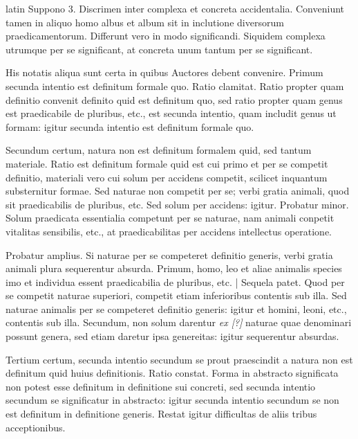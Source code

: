 \begin{otherlanguage*}{latin}
\pstart
Suppono 3. Discrimen inter complexa et  concreta accidentalia. Conveniunt tamen in aliquo homo albus et album sit in inclutione diversorum praedicamentorum. Differunt vero in modo significandi. Siquidem complexa utrumque per se significant, at concreta unum tantum per se significant. 
\pend

\pstart
His notatis aliqua sunt certa in quibus Auctores debent convenire. Primum secunda intentio est definitum formale quo. Ratio clamitat. Ratio propter quam definitio convenit definito quid est definitum quo, sed ratio propter quam genus est praedicabile de pluribus, etc., est secunda intentio, quam includit genus ut formam:
igitur secunda intentio est definitum formale quo. 
\pend

\pstart
Secundum certum, natura non est definitum formalem quid, sed tantum materiale. Ratio est definitum formale quid est cui primo et per se competit definitio, materiali vero cui solum per accidens competit, scilicet inquantum substernitur formae. Sed naturae non competit per se; verbi gratia animali, quod sit praedicabilis de pluribus, etc. Sed solum per accidens:
igitur. Probatur minor. Solum praedicata essentialia competunt per se naturae, nam animali conpetit vitalitas sensibilis, etc., at praedicabilitas per accidens intellectus operatione. 
\pend

\pstart
Probatur amplius. Si naturae per se competeret definitio generis, verbi gratia animali plura sequerentur absurda. Primum, homo, leo et aliae animalis species imo et individua essent praedicabilia de pluribus, etc. \textnormal{|} Sequela patet. Quod per se competit naturae superiori, competit etiam inferioribus contentis sub illa. Sed naturae animalis per se competeret definitio generis:
igitur et homini, leoni, etc., contentis sub illa. Secundum, non solum darentur \emph{ex [?]} naturae quae denominari possunt genera, sed etiam daretur ipsa genereitas:
igitur sequerentur absurdas. 
\pend

\pstart
Tertium certum, secunda intentio secundum se prout praescindit a natura non est definitum quid huius definitionis. Ratio constat. Forma in abstracto significata non potest esse definitum in definitione sui concreti, sed secunda intentio secundum se significatur in abstracto:
igitur secunda intentio secundum se non est definitum in definitione generis. Restat igitur difficultas de aliis tribus acceptionibus. 
\pend


\end{otherlanguage*}
